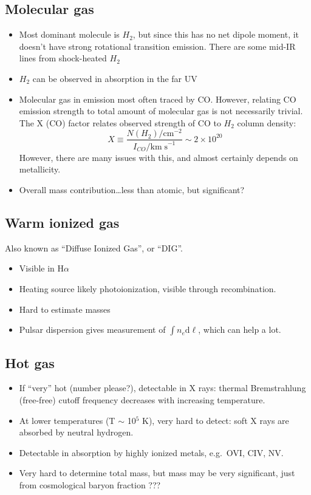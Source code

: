 \documentclass{article}
\newcommand{\mynotes}[1]{\textcolor{cadmiumgreen}{#1}}
\begin{document}
\subsection{Molecular gas}
\begin{itemize}
    \item Most dominant molecule is $H_{2}$, but since this has no net dipole moment,
        it doesn't have strong rotational transition emission.
        There are some mid-IR lines from shock-heated $H_{2}$
    \item $H_2$ can be observed in absorption in the far UV
    \item Molecular gas in emission most often traced by CO. However, relating
        CO emission strength to total amount of molecular gas is not
        necessarily trivial. The X (CO) factor
        relates observed strength of CO to $H_{2}$ column density:
        \[
            X \equiv \frac{
                N(H_{2})/\mathrm{cm}^{-2}}{
                I_{CO}/\mathrm{km\; s}^{-1}}
            \sim 2 \times 10^{20}
            \]
        However, there are many issues with this, and almost certainly
        depends on metallicity.
    \item Overall mass contribution\ldots less than atomic, but significant?
\end{itemize}

\subsection{Warm ionized gas}
Also known as ``Diffuse Ionized Gas'', or ``DIG''.
\begin{itemize}
    \item Visible in H$\alpha$
    \item Heating source likely photoionization, visible through
        recombination.
    \item Hard to estimate masses
    \item Pulsar dispersion gives measurement of $\int{n_{e}\mathrm{d}\ell}$,
        which can help a lot.
\end{itemize}

\subsection{Hot gas}
\begin{itemize}
    \item If ``very'' hot \mynotes{(number please?)}, detectable in X rays:
        thermal Bremstrahlung (free-free) cutoff frequency decreases with
        increasing temperature.
    \item  At lower temperatures (T $\sim$ 10$^{5}$ K), very hard to detect:
        soft X rays are absorbed by neutral hydrogen.
    \item Detectable in absorption by highly ionized metals,
        e.g.\ OVI, CIV, NV.
    \item Very hard to determine total mass, but mass may be
        very significant, just from cosmological baryon fraction \mynotes{???}
\end{itemize}
\end{document}
